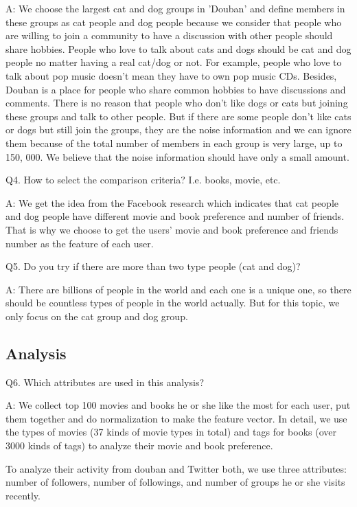 \documentclass[12pt]{article}
\begin{document}
A: We choose the largest cat and dog groups in 'Douban' and define members in these groups as cat people and dog people because we consider that people who are willing to join a community to have a discussion with other people should share hobbies. People who love to talk about cats and dogs should be cat and dog people no matter having a real cat/dog or not. For example, people who love to talk about pop music doesn't mean they have to own pop music CDs. Besides, Douban is a place for people who share common hobbies to have discussions and comments. There is no reason that people who don't like dogs or cats but joining these groups and talk to other people. But if there are some people don't like cats or dogs but still join the groups, they are the noise information and we can ignore them because of the total number of members in each group is very large, up to 150, 000. We believe that the noise information should have only a small amount.

Q4. How to select the comparison criteria? I.e. books, movie, etc.

A: We get the idea from the Facebook research which indicates that cat people and dog people have different movie and book preference and number of friends. That is why we choose to get the users' movie and book preference and friends number as the feature of each user.

Q5. Do you try if there are more than two type people (cat and dog)?

A: There are billions of people in the world and each one is a unique one, so there should be countless types of people in the world actually. But for this topic, we only focus on the cat group and dog group.

\subsection{Analysis}
Q6. Which attributes are used in this analysis?

A: We collect top 100 movies and books he or she like the most for each user, put them together and do normalization to make the feature vector. In detail, we use the types of movies (37 kinds of movie types in total) and tags for books (over 3000 kinds of tags) to analyze their movie and book preference.

To analyze their activity from douban and Twitter both, we use three attributes: number of followers, number of followings, and number of groups he or she visits recently.
\end{document}

